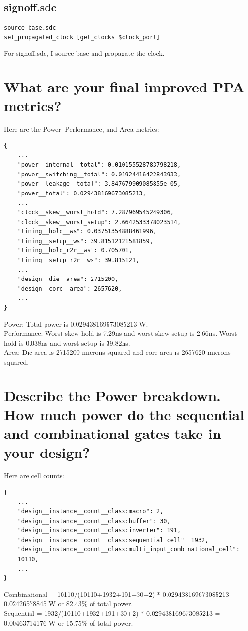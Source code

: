 \documentclass{article}
\begin{document}
\begin{flushleft}
\subsection{signoff.sdc}
\begin{lstlisting}
source base.sdc
set_propagated_clock [get_clocks $clock_port]
\end{lstlisting}
\noindent\makebox[\linewidth]{\rule{\paperwidth}{0.4pt}}
{\large For signoff.sdc, I source base and propagate the clock.}
\noindent\makebox[\linewidth]{\rule{\paperwidth}{1.2pt}}
\section{What are your final improved PPA metrics?}
Here are the Power, Performance, and Area metrics:
\begin{lstlisting}
{
    ...
    "power__internal__total": 0.010155528783798218,
    "power__switching__total": 0.01924416422843933,
    "power__leakage__total": 3.847679909085855e-05,
    "power__total": 0.029438169673085213,
    ...
    "clock__skew__worst_hold": 7.287969545249306,
    "clock__skew__worst_setup": 2.6642533378023514,
    "timing__hold__ws": 0.03751354888461996,
    "timing__setup__ws": 39.81512121581859,
    "timing__hold_r2r__ws": 0.705701,
    "timing__setup_r2r__ws": 39.815121,
    ...
    "design__die__area": 2715200,
    "design__core__area": 2657620,
    ...
}
\end{lstlisting}
Power: Total power is 0.029438169673085213 W. \\ Performance: Worst skew hold is 7.29ns and worst skew setup is 2.66ns. Worst hold is 0.038ns and worst setup is 39.82ns. \\ Area: Die area is 2715200 microns squared and core area is 2657620 microns squared.
\section{Describe the Power breakdown. How much power do the sequential and combinational gates
take in your design?}
Here are cell counts:
\begin{lstlisting}
{
    ...
    "design__instance__count__class:macro": 2,
    "design__instance__count__class:buffer": 30,
    "design__instance__count__class:inverter": 191,
    "design__instance__count__class:sequential_cell": 1932,
    "design__instance__count__class:multi_input_combinational_cell":
    10110,
    ...
}
\end{lstlisting}
Combinational =  10110/(10110+1932+191+30+2) * 0.029438169673085213 = 0.02426578845 W or 82.43\% of total power.\\
Sequential = 1932/(10110+1932+191+30+2) * 0.029438169673085213 = 0.00463714176 W or 15.75\% of total power.

\end{flushleft}
\end{document}
